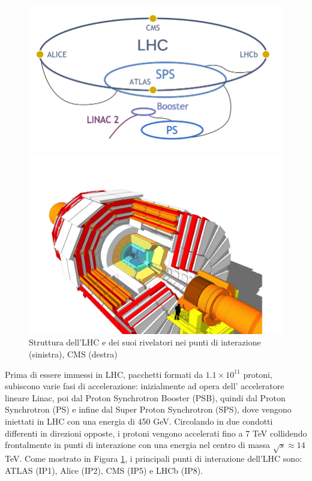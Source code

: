 \begin{figure}[t]
  \centering
  \begin{minipage}[b]{0.45\textwidth}
      \centering
      \includegraphics[width=\textwidth]{../ImmaginiTesi/LHC.png} 
  \end{minipage}
  \hfill 
  \begin{minipage}[b]{0.5\textwidth}
      \centering
      \includegraphics[width=\textwidth]{../ImmaginiTesi/CMS.png} 
  \end{minipage}
  \caption{Struttura dell'LHC e dei suoi rivelatori nei punti di interazione (sinistra), CMS (destra)}
  \label{fig:LHC-CMS}
\end{figure}


Prima di essere immessi in LHC, pacchetti formati da $1.1 \times 10^{11}$ protoni, subiscono varie fasi di accelerazione: inizialmente ad opera dell' acceleratore lineare Linac, poi dal Proton Synchrotron Booster (PSB), quindi dal Proton Synchrotron (PS) e infine dal Super Proton Synchrotron (SPS), dove vengono iniettati in LHC con una energia di 450 GeV. Circolando in due condotti differenti in direzioni opposte, i protoni vengono accelerati fino a 7 TeV collidendo frontalmente in punti di interazione con una energia nel centro di massa $\sqrt{s} \approx 14$ TeV. Come mostrato in Figura \ref{fig:LHC-CMS}, i principali punti di interazione dell'LHC sono: ATLAS (IP1), Alice (IP2), CMS (IP5) e LHCb (IP8).


